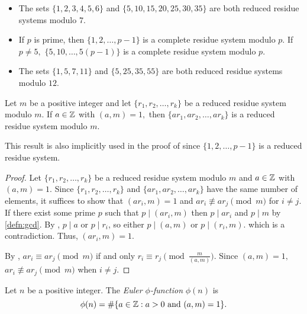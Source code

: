 \documentclass[letterpaper, 11 pt]{ximera}
\begin{document}
\begin{example}\label{example:reduced-sys}
    
    \begin{itemize}
        \item The sets $\{1,2,3,4,5,6\}$ and $\{5,10,15,20,25,30,35\}$ are both reduced residue systems modulo $7.$
        
        \item If $p$ is prime, then $\{1,2,\dots,p-1\}$ is a complete residue system modulo $p.$ If $p\neq 5,$ $\{5,10,\dots, 5(p-1)\}$ is a complete residue system modulo $p.$
        
        \item The sets $\{1,5,7,11\}$ and $\{5,25,35,55\}$ are both reduced residue systems modulo $12.$
    \end{itemize}
\end{example}


\begin{lem*}[Porism 2.18]\label{lem:reduced-sys}
    Let $m$ be a positive integer and let $\{r_1,r_2,\dots,r_k\}$ be a reduced residue system modulo $m.$ If $a\in\mathbb Z$ with $(a,m)=1,$ then $\{ar_1,ar_2,\dots,ar_k\}$ is a reduced residue system modulo $m.$
\end{lem*}
This result is also implicitly used in the proof of  since $\{1,2,\dots,p-1\}$ is a reduced residue system.

\begin{proof}
    Let $\{r_1,r_2,\dots,r_k\}$ be a reduced residue system modulo $m$ and $a\in\mathbb Z$ with $(a,m)=1.$ Since $\{r_1,r_2,\dots,r_k\}$ and $\{ar_1,ar_2,\dots,ar_k\}$ have the same number of elements, it suffices to show that $(ar_i,m)=1$ and  $ar_i\not\equiv ar_j\pmod{m}$ for $i\neq j.$ If there exist some prime $p$ such that $p\mid(ar_i,m)$ then $p\mid ar_i$ and $p\mid m$ by \autoref{defn:gcd}. By , $p\mid a$ or $p\mid r_i$, so either $p\mid (a,m)$ or $p\mid (r_i,m).$ which is a contradiction. Thus, $(ar_i,m)=1.$

    By , $ar_i\equiv ar_j\pmod{m}$ if and only $r_i\equiv r_j \pmod{\tfrac{m}{(a,m)}}.$ Since $(a,m)=1,$ $ar_i\not\equiv ar_j\pmod{m}$ when $i\neq j$.
\end{proof}


\begin{defn}\label{defn:phi-fn}
    Let $n$ be a positive integer. The \emph{Euler $\phi$-function} $\phi(n)$ is \[\phi(n)=\#\{a\in\mathbb Z : a>0 \textnormal{ and } (a,m)=1\}.\]
\end{defn}
\end{document}
